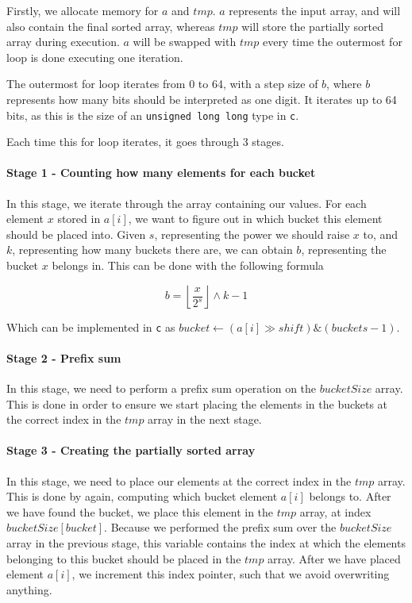 \documentclass{article}
\begin{document}
Firstly, we allocate memory for \( a \) and \( tmp \). \( a \) represents the input array, and will also contain the final sorted array, whereas \( tmp \) will store the partially sorted array during execution. \( a \) will be swapped with \( tmp \) every time the outermost for loop is done executing one iteration.
\medskip

The outermost for loop iterates from 0 to 64, with a step size of \( b \), where \( b \) represents how many bits should be interpreted as one digit. It iterates up to 64 bits, as this is the size of an \texttt{unsigned long long} type in \texttt{c}.
\medskip

Each time this for loop iterates, it goes through 3 stages.

\paragraph{Stage 1 - Counting how many elements for each bucket}
In this stage, we iterate through the array containing our values. For each element \( x \) stored in \( a[i] \), we want to figure out in which bucket this element should be placed into. Given \( s \), representing the power we should raise \( x \) to, and \( k \), representing how many buckets there are, we can obtain \( b \), representing the bucket \( x \) belongs in. This can be done with the following formula

\[ b = \left\lfloor\frac{x}{2^{s}}\right\rfloor \wedge k-1 \]

Which can be implemented in \texttt{c} as \(bucket \leftarrow (a[i] \gg shift) \& (buckets - 1)\).

\paragraph{Stage 2 - Prefix sum}
In this stage, we need to perform a prefix sum operation on the \( bucketSize \) array. This is done in order to ensure we start placing the elements in the buckets at the correct index in the \( tmp \) array in the next stage.

\paragraph{Stage 3 - Creating the partially sorted array}
In this stage, we need to place our elements at the correct index in the \( tmp \) array. This is done by again, computing which bucket element \( a[i] \) belongs to. After we have found the bucket, we place this element in the \( tmp \) array, at index \( bucketSize[bucket] \). Because we performed the prefix sum over the \( bucketSize \) array in the previous stage, this variable contains the index at which the elements belonging to this bucket should be placed in the \( tmp \) array. After we have placed element \( a[i] \), we increment this index pointer, such that we avoid overwriting anything.
\end{document}
